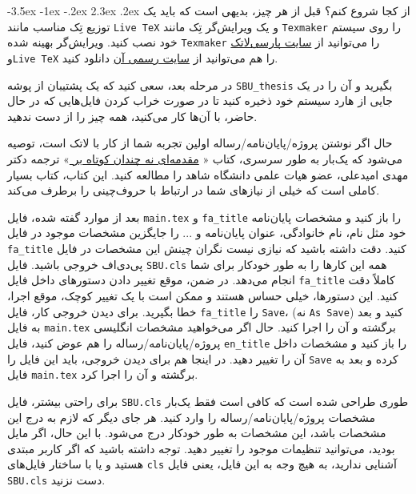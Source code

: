 \documentclass[a4paper,12pt]{article}
\makeatletter
\renewcommand\section{\@startsection {section}{1}{\z@}%
                                   {-3.5ex \@plus -1ex \@minus -.2ex}%
                                   {2.3ex \@plus.2ex}%
                                   {\normalfont\large\bfseries}}
\newcommand{\پ}{پروژه/پایان‌نامه/رساله }
\makeatother
\begin{document}
\section{از کجا شروع کنم؟}
قبل از هر چیز، بدیهی است که باید یک توزیع تِک مناسب مانند 
\verb!Live TeX!
و یک ویرایش‌گر تِک مانند
\verb!Texmaker!
را روی سیستم خود نصب کنید.  ویرایش‌گر بهینه شده \verb!Texmaker! را می‌توانید از 
 \href{http://www.parsilatex.com}{سایت پارسی‌لاتک}%
 و\verb!Live TeX!  را هم می‌توانید از 
 \href{http://www.tug.org/texlive}{سایت رسمی آن}%
 دانلود کنید.
 
در مرحله بعد، سعی کنید که  یک پشتیبان از پوشه 
\verb!SBU_thesis!
 بگیرید و آن را در یک جایی از هارد سیستم خود ذخیره کنید تا در صورت خراب کردن فایل‌هایی که در حال حاضر، با آن‌ها کار می‌کنید، همه چیز را از 
 دست ندهید.
 
 حال اگر نوشتن \پ اولین تجربه شما از کار با لاتک است، توصیه می‌شود که یک‌بار به طور سرسری، کتاب «%
\href{http://www.tug.ctan.org/tex-archive/info/lshort/persian/lshort.pdf}{مقدمه‌ای نه چندان کوتاه بر
\lr{\LaTeXe}}»
   ترجمه دکتر مهدی امیدعلی، عضو هیات علمی دانشگاه شاهد را مطالعه کنید. این کتاب، کتاب بسیار کاملی است که خیلی از نیازهای شما در ارتباط با حروف‌چینی را برطرف می‌کند.
 
 
بعد از موارد گفته شده، فایل 
\verb!main.tex!
و
\verb!fa_title!
را باز کنید و مشخصات پایان‌نامه خود مثل نام، نام خانوادگی، عنوان پایان‌نامه و ... را جایگزین مشخصات موجود در فایل
\verb!fa_title!
 کنید. دقت داشته باشید که نیازی نیست 
نگران چینش این مشخصات در فایل پی‌دی‌اف خروجی باشید. فایل 
\verb!SBU.cls!
همه این کارها را به طور خودکار برای شما انجام می‌دهد. در ضمن، موقع تغییر دادن دستورهای داخل فایل
\verb!fa_title!
 کاملاً دقت کنید. این دستورها، خیلی حساس هستند و ممکن است با یک تغییر کوچک، موقع اجرا، خطا بگیرید. برای دیدن خروجی کار، فایل 
\verb!fa_title!
 را 
\verb!Save!، 
(نه 
\verb!As Save!)
کنید و بعد به فایل 
\verb!main.tex!
برگشته و آن را اجرا کنید. حال اگر می‌خواهید مشخصات انگلیسی \پ را هم عوض کنید، فایل 
\verb!en_title!
را باز کنید و مشخصات داخل آن را تغییر دهید.%
 در اینجا هم برای دیدن خروجی، باید این فایل را 
\verb!Save!
کرده و بعد به فایل 
\verb!main.tex!
برگشته و آن را اجرا کرد.

برای راحتی بیشتر، 
فایل 
\verb!SBU.cls!
طوری طراحی شده است که کافی است فقط  یک‌بار مشخصات \پ  را وارد کنید. هر جای دیگر که لازم به درج این مشخصات باشد، این مشخصات به طور خودکار درج می‌شود. با این حال، اگر مایل بودید، می‌توانید تنظیمات موجود را تغییر دهید. توجه داشته باشید که اگر کاربر مبتدی هستید و یا با ساختار فایل‌های  
\verb!cls!
 آشنایی ندارید، به هیچ وجه به این فایل، یعنی فایل 
\verb!SBU.cls!
دست نزنید.
\end{document}
